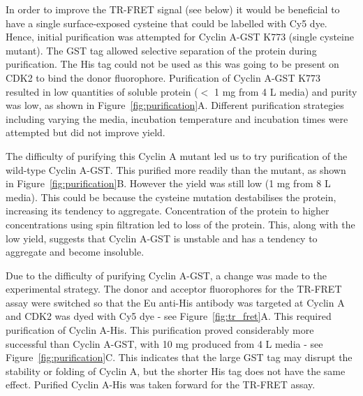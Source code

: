 In order to improve the TR-FRET signal (see below) it would be beneficial to have a single surface-exposed cysteine that could be labelled with Cy5 dye.
Hence, initial purification was attempted for Cyclin A-GST K773 (single cysteine mutant).
The GST tag allowed selective separation of the protein during purification.
The His tag could not be used as this was going to be present on CDK2 to bind the donor fluorophore.
Purification of Cyclin A-GST K773 resulted in low quantities of soluble protein ($<$ 1 mg from 4 L media) and purity was low, as shown in Figure~\ref{fig:purification}A.
Different purification strategies including varying the media, incubation temperature and incubation times were attempted but did not improve yield.

The difficulty of purifying this Cyclin A mutant led us to try purification of the wild-type Cyclin A-GST.
This purified more readily than the mutant, as shown in Figure~\ref{fig:purification}B.
However the yield was still low (1 mg from 8 L media).
This could be because the cysteine mutation destabilises the protein, increasing its tendency to aggregate.
Concentration of the protein to higher concentrations using spin filtration led to loss of the protein.
This, along with the low yield, suggests that Cyclin A-GST is unstable and has a tendency to aggregate and become insoluble.

Due to the difficulty of purifying Cyclin A-GST, a change was made to the experimental strategy.
The donor and acceptor fluorophores for the TR-FRET assay were switched so that the Eu anti-His antibody was targeted at Cyclin A and CDK2 was dyed with Cy5 dye - see Figure~\ref{fig:tr_fret}A.
This required purification of Cyclin A-His.
This purification proved considerably more successful than Cyclin A-GST, with 10 mg produced from 4 L media - see Figure~\ref{fig:purification}C.
This indicates that the large GST tag may disrupt the stability or folding of Cyclin A, but the shorter His tag does not have the same effect.
Purified Cyclin A-His was taken forward for the TR-FRET assay.

